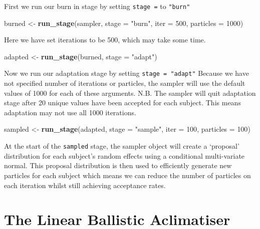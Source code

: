 \documentclass[]{book}
\newenvironment{Shaded}{\begin{snugshade}}{\end{snugshade}}
\newcommand{\KeywordTok}[1]{\textcolor[rgb]{0.13,0.29,0.53}{\textbf{#1}}}
\newcommand{\DataTypeTok}[1]{\textcolor[rgb]{0.13,0.29,0.53}{#1}}
\newcommand{\DecValTok}[1]{\textcolor[rgb]{0.00,0.00,0.81}{#1}}
\newcommand{\StringTok}[1]{\textcolor[rgb]{0.31,0.60,0.02}{#1}}
\newcommand{\NormalTok}[1]{#1}
\begin{document}
First we run our burn in stage by setting \texttt{stage\ =} to
\texttt{"burn"}

\begin{Shaded}
\begin{Highlighting}[]
\NormalTok{burned <-}\StringTok{ }\KeywordTok{run_stage}\NormalTok{(sampler, }\DataTypeTok{stage =} \StringTok{"burn"}\NormalTok{, }\DataTypeTok{iter =} \DecValTok{500}\NormalTok{, }\DataTypeTok{particles =} \DecValTok{1000}\NormalTok{)}
\end{Highlighting}
\end{Shaded}

Here we have set iterations to be 500, which may take some time.

\begin{Shaded}
\begin{Highlighting}[]
\NormalTok{adapted <-}\StringTok{ }\KeywordTok{run_stage}\NormalTok{(burned, }\DataTypeTok{stage =} \StringTok{"adapt"}\NormalTok{)}
\end{Highlighting}
\end{Shaded}

Now we run our adaptation stage by setting \texttt{stage\ =\ "adapt"}
Because we have not specified number of iterations or particles, the
sampler will use the default values of 1000 for each of these arguments.
N.B. The sampler will quit adaptation stage after 20 unique values have
been accepted for each subject. This means adaptation may not use all
1000 iterations.

\begin{Shaded}
\begin{Highlighting}[]
\NormalTok{sampled <-}\StringTok{ }\KeywordTok{run_stage}\NormalTok{(adapted, }\DataTypeTok{stage =} \StringTok{"sample"}\NormalTok{, }\DataTypeTok{iter =} \DecValTok{100}\NormalTok{, }\DataTypeTok{particles =} \DecValTok{100}\NormalTok{)}
\end{Highlighting}
\end{Shaded}

At the start of the \texttt{sampled} stage, the sampler object will
create a `proposal' distribution for each subject's random effects using
a conditional multi-variate normal. This proposal distribution is then
used to efficiently generate new particles for each subject which means
we can reduce the number of particles on each iteration whilst still
achieving acceptance rates.

\chapter{The Linear Ballistic
Aclimatiser}\label{the-linear-ballistic-aclimatiser}
\end{document}
